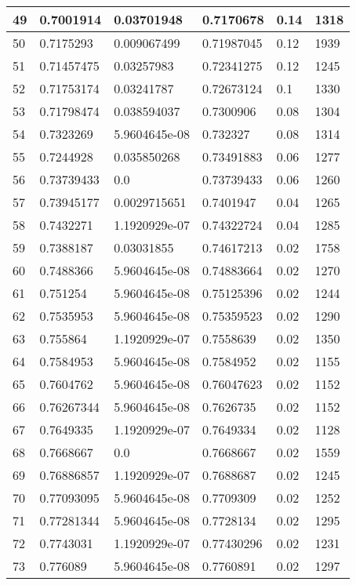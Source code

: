 \begin{longtable}{|l|l|l|l|l|l|}
49 & 0.7001914 & 0.03701948 & 0.7170678 & 0.14 & 1318 \\ \hline 
50 & 0.7175293 & 0.009067499 & 0.71987045 & 0.12 & 1939 \\ \hline 
51 & 0.71457475 & 0.03257983 & 0.72341275 & 0.12 & 1245 \\ \hline 
52 & 0.71753174 & 0.03241787 & 0.72673124 & 0.1 & 1330 \\ \hline 
53 & 0.71798474 & 0.038594037 & 0.7300906 & 0.08 & 1304 \\ \hline 
54 & 0.7323269 & 5.9604645e-08 & 0.732327 & 0.08 & 1314 \\ \hline 
55 & 0.7244928 & 0.035850268 & 0.73491883 & 0.06 & 1277 \\ \hline 
56 & 0.73739433 & 0.0 & 0.73739433 & 0.06 & 1260 \\ \hline 
57 & 0.73945177 & 0.0029715651 & 0.7401947 & 0.04 & 1265 \\ \hline 
58 & 0.7432271 & 1.1920929e-07 & 0.74322724 & 0.04 & 1285 \\ \hline 
59 & 0.7388187 & 0.03031855 & 0.74617213 & 0.02 & 1758 \\ \hline 
60 & 0.7488366 & 5.9604645e-08 & 0.74883664 & 0.02 & 1270 \\ \hline 
61 & 0.751254 & 5.9604645e-08 & 0.75125396 & 0.02 & 1244 \\ \hline 
62 & 0.7535953 & 5.9604645e-08 & 0.75359523 & 0.02 & 1290 \\ \hline 
63 & 0.755864 & 1.1920929e-07 & 0.7558639 & 0.02 & 1350 \\ \hline 
64 & 0.7584953 & 5.9604645e-08 & 0.7584952 & 0.02 & 1155 \\ \hline 
65 & 0.7604762 & 5.9604645e-08 & 0.76047623 & 0.02 & 1152 \\ \hline 
66 & 0.76267344 & 5.9604645e-08 & 0.7626735 & 0.02 & 1152 \\ \hline 
67 & 0.7649335 & 1.1920929e-07 & 0.7649334 & 0.02 & 1128 \\ \hline 
68 & 0.7668667 & 0.0 & 0.7668667 & 0.02 & 1559 \\ \hline 
69 & 0.76886857 & 1.1920929e-07 & 0.7688687 & 0.02 & 1245 \\ \hline 
70 & 0.77093095 & 5.9604645e-08 & 0.7709309 & 0.02 & 1252 \\ \hline 
71 & 0.77281344 & 5.9604645e-08 & 0.7728134 & 0.02 & 1295 \\ \hline 
72 & 0.7743031 & 1.1920929e-07 & 0.77430296 & 0.02 & 1231 \\ \hline 
73 & 0.776089 & 5.9604645e-08 & 0.7760891 & 0.02 & 1297 \\ \hline 

\end{longtable}
